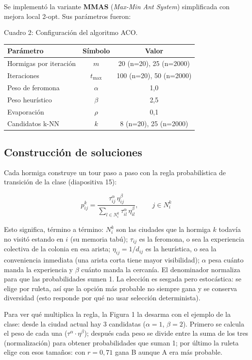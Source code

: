 \documentclass[12pt,a4paper]{article}
\begin{document}
Se implementó la variante \textbf{MMAS} (\textit{Max-Min Ant System})
simplificada con mejora local 2-opt. Sus parámetros fueron:

Cuadro 2: Configuración del algoritmo ACO.
\begin{center}
\begin{tabular}{lcc}
\toprule
Parámetro & Símbolo & Valor \\
\midrule
Hormigas por iteración & $m$ & 20 (n=20), 25 (n=2000) \\
Iteraciones & $t_{\max}$ & 100 (n=20), 50 (n=2000) \\
Peso de feromona & $\alpha$ & 1,0 \\
Peso heurístico & $\beta$ & 2,5 \\
Evaporación & $\rho$ & 0,1 \\
Candidatos k-NN & $k$ & 8 (n=20), 25 (n=2000) \\
\bottomrule
\end{tabular}
\end{center}

\subsection{Construcción de soluciones}

Cada hormiga construye un tour paso a paso con la regla probabilística de
transición de la clase (diapositiva 15):

\begin{equation}
p_{ij}^k = \frac{\tau_{ij}^{\alpha} \, \eta_{ij}^{\beta}}
{\sum_{l \in N_i^k} \tau_{il}^{\alpha} \, \eta_{il}^{\beta}},
\qquad j \in N_i^k
\end{equation}

Esto significa, término a término: $N_i^k$ son las ciudades que la hormiga $k$
todavía no visitó estando en $i$ (su memoria tabú); $\tau_{ij}$ es la feromona,
o sea la experiencia colectiva de la colonia en esa arista; $\eta_{ij} =
1/d_{ij}$ es la heurística, o sea la conveniencia inmediata (una arista corta
tiene mayor visibilidad); $\alpha$ pesa cuánto manda la experiencia y $\beta$
cuánto manda la cercanía. El denominador normaliza para que las
probabilidades sumen 1. La elección es sesgada pero estocástica: se elige por
ruleta, así que la opción más probable no siempre gana y se conserva
diversidad (esto responde por qué no usar selección determinista).

Para ver qué multiplica la regla, la Figura 1 la desarma con el ejemplo de la
clase: desde la ciudad actual hay 3 candidatas ($\alpha = 1$, $\beta = 2$).
Primero se calcula el peso de cada una ($\tau^\alpha \cdot \eta^\beta$);
después cada peso se divide entre la suma de los tres (normalización) para
obtener probabilidades que suman 1; por último la ruleta elige con esos
tamaños: con $r = 0,71$ gana B aunque A era más probable.
\end{document}
